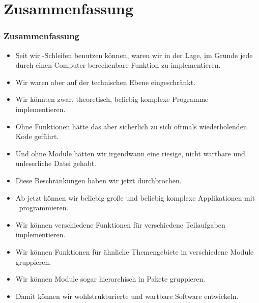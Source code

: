 \documentclass[aspectratio=169,mathserif,notheorems]{beamer}%
\begin{document}
\section{Zusammenfassung}%
%
\begin{frame}%
\frametitle{Zusammenfassung}%
\begin{itemize}%
%
\item Seit wir -Schleifen benutzen können, waren wir in der Lage, im Grunde jede durch einen Computer berechenbare Funktion zu implementieren.%
%
\item<2-> Wir waren aber auf der technischen Ebene eingeschränkt.
%
\item<3-> Wir könnten zwar, theoretisch, beliebig komplexe Programme implementieren.%
%
\item<4-> Ohne Funktionen hätte das aber sicherlich zu sich oftmals wiederholenden Kode geführt.%
%
\item<5-> Und ohne Module hätten wir irgendwann eine riesige, nicht wartbare und unleserliche Datei gehabt.%
%
\item<6-> Diese Beschränkungen haben wir jetzt durchbrochen.%
%
\item<7-> Ab jetzt können wir beliebig große und beliebig komplexe Applikationen mit \python\ programmieren.%
%
\item<8-> Wir können verschiedene Funktionen für verschiedene Teilaufgaben implementieren.%
%
\item<9-> Wir können Funktionen für ähnliche Themengebiete in verschiedene Module gruppieren.%
%
\item<10-> Wir können Module sogar hierarchisch in Pakete gruppieren.%
%
\item<11-> Damit können wir wohlstrukturierte und wartbare Software entwickeln.%
\end{itemize}%
\end{frame}%
%
\endPresentation%
\end{document}
